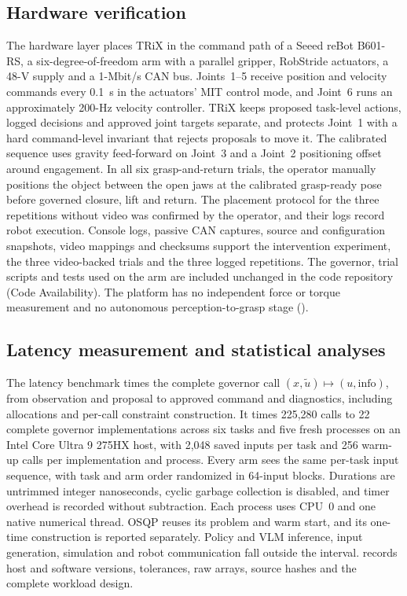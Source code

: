 \documentclass[12pt]{article}
\begin{document}
\subsection{Hardware verification}
\label{sec:hardware-methods}
The hardware layer places TRiX in the command path of a Seeed reBot B601-RS, a
six-degree-of-freedom arm with a parallel gripper, RobStride actuators, a 48-V
supply and a 1-Mbit/s CAN bus. Joints~1--5 receive position and velocity
commands every 0.1~s in the actuators' MIT control mode, and Joint~6 runs
an approximately 200-Hz velocity controller. TRiX keeps proposed task-level
actions, logged decisions and approved joint targets separate, and protects
Joint~1 with a hard command-level invariant that rejects proposals to move it. The calibrated
sequence uses gravity feed-forward on Joint~3 and a Joint~2 positioning offset around engagement. In all six grasp-and-return trials, the
operator manually positions the object between the open jaws at the calibrated
grasp-ready pose before governed closure, lift and return. The placement
protocol for the three repetitions without video was confirmed by the operator, and their
logs record robot execution. Console logs, passive CAN captures, source and
configuration snapshots, video mappings and checksums support the intervention
experiment, the three video-backed trials and the three logged repetitions.
The governor, trial scripts and tests used on the arm are included unchanged in
the code repository (Code Availability). The platform has no independent force
or torque measurement and no autonomous perception-to-grasp stage
().

\subsection{Latency measurement and statistical analyses}
\label{sec:statistics}
The latency benchmark times the complete governor call
$(x,\tilde u)\mapsto(u,\mathrm{info})$, from observation and proposal to
approved command and diagnostics, including allocations and per-call
constraint construction. It times 225,280 calls to 22 complete governor
implementations across six tasks and five fresh processes on an Intel Core
Ultra 9 275HX host, with 2,048 saved inputs per task and 256 warm-up calls per
implementation and process. Every arm sees the same per-task input sequence,
with task and arm order randomized in 64-input blocks. Durations are untrimmed
integer nanoseconds, cyclic garbage collection is disabled, and timer overhead
is recorded without subtraction. Each process uses CPU~0 and one native
numerical thread. OSQP \cite{ref46} reuses its problem and warm start, and its
one-time construction is reported separately. Policy and VLM inference, input
generation, simulation and robot communication fall outside the interval.
 records host and software versions, tolerances, raw arrays,
source hashes and the complete workload design.
\end{document}
